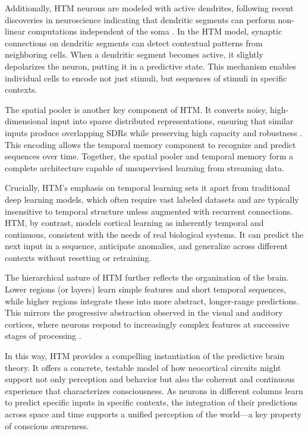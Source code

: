 \documentclass{article}
\begin{document}
Additionally, HTM neurons are modeled with active dendrites, following recent discoveries in neuroscience indicating that dendritic segments can perform non-linear computations independent of the soma \parencite{hawkins2016why}. In the HTM model, synaptic connections on dendritic segments can detect contextual patterns from neighboring cells. When a dendritic segment becomes active, it slightly depolarizes the neuron, putting it in a predictive state. This mechanism enables individual cells to encode not just stimuli, but sequences of stimuli in specific contexts.

The spatial pooler is another key component of HTM. It converts noisy, high-dimensional input into sparse distributed representations, ensuring that similar inputs produce overlapping SDRs while preserving high capacity and robustness \parencite{cui2017spatial}. This encoding allows the temporal memory component to recognize and predict sequences over time. Together, the spatial pooler and temporal memory form a complete architecture capable of unsupervised learning from streaming data.

Crucially, HTM's emphasis on temporal learning sets it apart from traditional deep learning models, which often require vast labeled datasets and are typically insensitive to temporal structure unless augmented with recurrent connections. HTM, by contrast, models cortical learning as inherently temporal and continuous, consistent with the needs of real biological systems. It can predict the next input in a sequence, anticipate anomalies, and generalize across different contexts without resetting or retraining.

The hierarchical nature of HTM further reflects the organization of the brain. Lower regions (or layers) learn simple features and short temporal sequences, while higher regions integrate these into more abstract, longer-range predictions. This mirrors the progressive abstraction observed in the visual and auditory cortices, where neurons respond to increasingly complex features at successive stages of processing \parencite{hawkins2009sequence, clark2016surfing}.

In this way, HTM provides a compelling instantiation of the predictive brain theory. It offers a concrete, testable model of how neocortical circuits might support not only perception and behavior but also the coherent and continuous experience that characterizes consciousness. As neurons in different columns learn to predict specific inputs in specific contexts, the integration of their predictions across space and time supports a unified perception of the world---a key property of conscious awareness.
\end{document}
